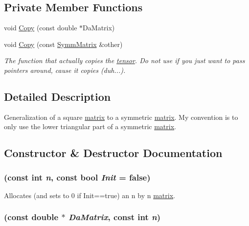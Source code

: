 \subsection*{Private Member Functions}
\begin{DoxyCompactItemize}
\item 
void \hyperlink{classJKBuilder_1_1SymmMatrix_aa9f626f684be5ba6ce49b6a335c2e5fe}{Copy} (const double $\ast$DaMatrix)
\item 
void \hyperlink{classJKBuilder_1_1SymmMatrix_a7be0365900350f51e54969bb1961af8f}{Copy} (const \hyperlink{classJKBuilder_1_1SymmMatrix}{SymmMatrix} \&other)
\begin{DoxyCompactList}\small\item\em The function that actually copies the \hyperlink{classJKBuilder_1_1tensor}{tensor}. Do not use if you just want to pass pointers around, cause it copies (duh...). \item\end{DoxyCompactList}\end{DoxyCompactItemize}


\subsection{Detailed Description}
Generalization of a square \hyperlink{classJKBuilder_1_1matrix}{matrix} to a symmetric \hyperlink{classJKBuilder_1_1matrix}{matrix}. My convention is to only use the lower triangular part of a symmetric \hyperlink{classJKBuilder_1_1matrix}{matrix}. 

\subsection{Constructor \& Destructor Documentation}
\hypertarget{classJKBuilder_1_1SymmMatrix_a0232cfa05984c1f35917eff2a56a77dc}{
\subsubsection[{SymmMatrix}]{ (const int {\em n}, \/  const bool {\em Init} = {\ttfamily false})}}
\label{classJKBuilder_1_1SymmMatrix_a0232cfa05984c1f35917eff2a56a77dc}


Allocates (and sets to 0 if Init==true) an n by n \hyperlink{classJKBuilder_1_1matrix}{matrix}. \hypertarget{classJKBuilder_1_1SymmMatrix_a772cb659e7f24da6add4891fe3a176e2}{
\subsubsection[{SymmMatrix}]{ (const double $\ast$ {\em DaMatrix}, \/  const int {\em n})}}
\label{classJKBuilder_1_1SymmMatrix_a772cb659e7f24da6add4891fe3a176e2}


